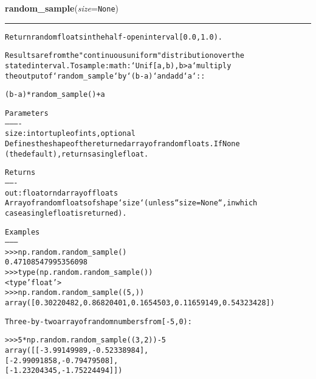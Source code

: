 \hspace{.8\funcindent}\begin{boxedminipage}{\funcwidth}

    \raggedright \textbf{random\_sample}(\textit{size}={\tt None})

    \vspace{-1.5ex}

    \rule{\textwidth}{0.5\fboxrule}
\setlength{\parskip}{2ex}
\begin{alltt}
Return random floats in the half-open interval [0.0, 1.0).

Results are from the "continuous uniform" distribution over the
stated interval.  To sample :math:`Unif[a, b), b {\textgreater} a` multiply
the output of `random\_sample` by `(b-a)` and add `a`::

  (b - a) * random\_sample() + a

Parameters
----------
size : int or tuple of ints, optional
    Defines the shape of the returned array of random floats. If None
    (the default), returns a single float.

Returns
-------
out : float or ndarray of floats
    Array of random floats of shape `size` (unless ``size=None``, in which
    case a single float is returned).

Examples
--------
{\textgreater}{\textgreater}{\textgreater} np.random.random\_sample()
0.47108547995356098
{\textgreater}{\textgreater}{\textgreater} type(np.random.random\_sample())
{\textless}type 'float'{\textgreater}
{\textgreater}{\textgreater}{\textgreater} np.random.random\_sample((5,))
array([ 0.30220482,  0.86820401,  0.1654503 ,  0.11659149,  0.54323428])

Three-by-two array of random numbers from [-5, 0):

{\textgreater}{\textgreater}{\textgreater} 5 * np.random.random\_sample((3, 2)) - 5
array([[-3.99149989, -0.52338984],
       [-2.99091858, -0.79479508],
       [-1.23204345, -1.75224494]])
\end{alltt}

\setlength{\parskip}{1ex}
    \end{boxedminipage}

    \label{QSTK:qstklearn:mldiagnostics:rayleigh}

    \vspace{0.5ex}


